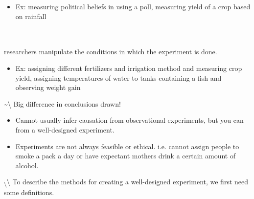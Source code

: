 \documentclass[]{book}
\begin{document}
\begin{itemize}
\item Ex: measuring political beliefs in using a poll, measuring yield of a crop based on rainfall\\~\\~\\
\end{itemize}

\underbar{~~~~~~~~~~~~~~~~~~~~~~~~~~~~~~~~~~~~} researchers manipulate
the conditions in which the experiment is done.

\begin{itemize}
\item Ex: assigning different fertilizers and irrigation method and measuring crop yield, assigning temperatures of water to tanks containing a fish and observing weight gain
\end{itemize}

\textasciitilde{}\textbackslash{} Big difference in conclusions drawn!

\begin{itemize}
\item Cannot usually infer causation from observational experiments, but you can from a well-designed experiment.
\item Experiments are not always feasible or ethical.  i.e. cannot assign people to smoke a pack a day or have expectant mothers drink a certain amount of alcohol.
\end{itemize}

\textsubscript{\textbackslash{}}\textbackslash{} To describe the methods
for creating a well-designed experiment, we first need some definitions.
\end{document}
